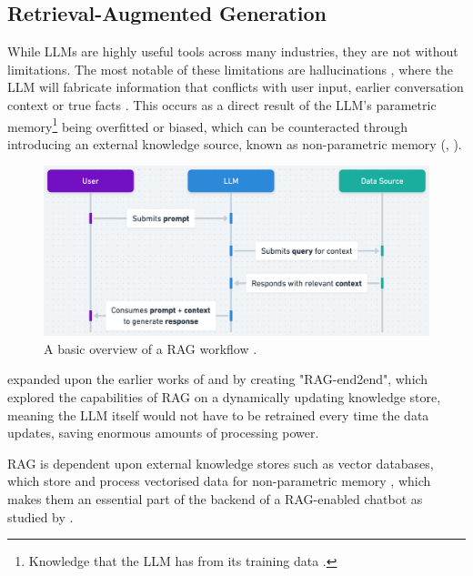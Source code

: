 \documentclass[12pt]{report}
\begin{document}
    \subsection{Retrieval-Augmented Generation}

    While LLMs are highly useful tools across many industries, they are not without limitations. The most notable 
    of these limitations are hallucinations \autocite{lewis_retrieval-augmented_2021}, where the LLM will fabricate 
    information that conflicts with user input, earlier conversation context or true facts \autocite{zhang_sirens_2023}. This occurs as a direct result of the LLM's parametric memory\footnote{Knowledge that the LLM has from its training data \autocite{siriwardhana_improving_2023}.}
    being overfitted or biased, which can be counteracted through introducing an external knowledge source, known as non-parametric memory (\textcite{komeili_internet-augmented_2022}, \textcite{siriwardhana_improving_2023}).
    
    \begin{figure}[H] 
        \centering
        \includegraphics[width=.8\linewidth]{RAGProcess.png}
        \caption{A basic overview of a RAG workflow \autocite{openai_retrieval_nodate}.}
        \label{fig:RAGProcess}
    \end{figure}

    \textcite{siriwardhana_improving_2023} expanded upon the earlier works of \textcite{karpukhin_dense_2020} and \textcite{lewis_pre-training_2020} by creating 
    "RAG-end2end", which explored the capabilities of RAG on a dynamically updating knowledge store, meaning the LLM itself would not have to be retrained 
    every time the data updates, saving enormous amounts of processing power.
    
    RAG is dependent upon external knowledge stores such as vector databases, which store and process vectorised data
    for non-parametric memory \autocite{li_modernization_2023}, which makes them an essential part of the backend of 
    a RAG-enabled chatbot as studied by \textcite{odede_jaybot_2024}. 
    
\end{document}
